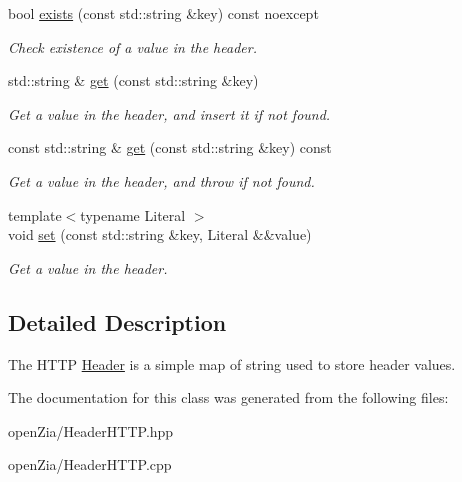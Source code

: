 \begin{DoxyCompactItemize}
\item 
\mbox{\label{classo_z_1_1o_z_1_1_h_t_t_p_1_1_header_ab1d6ccb2829b59d61de00e9000929ede}} 
bool \mbox{\hyperlink{classo_z_1_1o_z_1_1_h_t_t_p_1_1_header_ab1d6ccb2829b59d61de00e9000929ede}{exists}} (const std\+::string \&key) const noexcept
\begin{DoxyCompactList}\small\item\em Check existence of a value in the header. \end{DoxyCompactList}\item 
\mbox{\label{classo_z_1_1o_z_1_1_h_t_t_p_1_1_header_a6d679d9431ae700a22accadd77616194}} 
std\+::string \& \mbox{\hyperlink{classo_z_1_1o_z_1_1_h_t_t_p_1_1_header_a6d679d9431ae700a22accadd77616194}{get}} (const std\+::string \&key)
\begin{DoxyCompactList}\small\item\em Get a value in the header, and insert it if not found. \end{DoxyCompactList}\item 
\mbox{\label{classo_z_1_1o_z_1_1_h_t_t_p_1_1_header_acb0cba9e469ca227411584a4d5485b91}} 
const std\+::string \& \mbox{\hyperlink{classo_z_1_1o_z_1_1_h_t_t_p_1_1_header_acb0cba9e469ca227411584a4d5485b91}{get}} (const std\+::string \&key) const
\begin{DoxyCompactList}\small\item\em Get a value in the header, and throw if not found. \end{DoxyCompactList}\item 
\mbox{\label{classo_z_1_1o_z_1_1_h_t_t_p_1_1_header_ae42db1a4bb2515ca7474f3439d7e6804}} 
{\footnotesize template$<$typename Literal $>$ }\\void \mbox{\hyperlink{classo_z_1_1o_z_1_1_h_t_t_p_1_1_header_ae42db1a4bb2515ca7474f3439d7e6804}{set}} (const std\+::string \&key, Literal \&\&value)
\begin{DoxyCompactList}\small\item\em Get a value in the header. \end{DoxyCompactList}\end{DoxyCompactItemize}


\subsection{Detailed Description}
The H\+T\+TP \mbox{\hyperlink{classo_z_1_1o_z_1_1_h_t_t_p_1_1_header}{Header}} is a simple map of string used to store header values. 

The documentation for this class was generated from the following files\+:\begin{DoxyCompactItemize}
\item 
open\+Zia/Header\+H\+T\+T\+P.\+hpp\item 
open\+Zia/Header\+H\+T\+T\+P.\+cpp\end{DoxyCompactItemize}
